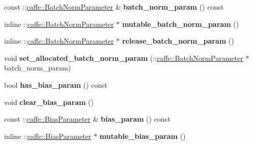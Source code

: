 \begin{DoxyCompactItemize}
const \+::\mbox{\hyperlink{classcaffe_1_1_batch_norm_parameter}{caffe\+::\+Batch\+Norm\+Parameter}} \& {\bfseries batch\+\_\+norm\+\_\+param} () const
\item 
\mbox{\label{classcaffe_1_1_layer_parameter_a4ec80c6e21c519f85e61f1403fd476d7}} 
inline \+::\mbox{\hyperlink{classcaffe_1_1_batch_norm_parameter}{caffe\+::\+Batch\+Norm\+Parameter}} $\ast$ {\bfseries mutable\+\_\+batch\+\_\+norm\+\_\+param} ()
\item 
\mbox{\label{classcaffe_1_1_layer_parameter_afbb8556a5265d6587b0ffab77b5e0688}} 
inline \+::\mbox{\hyperlink{classcaffe_1_1_batch_norm_parameter}{caffe\+::\+Batch\+Norm\+Parameter}} $\ast$ {\bfseries release\+\_\+batch\+\_\+norm\+\_\+param} ()
\item 
\mbox{\label{classcaffe_1_1_layer_parameter_a5f0101a591a38ef54b17f3f054821017}} 
void {\bfseries set\+\_\+allocated\+\_\+batch\+\_\+norm\+\_\+param} (\+::\mbox{\hyperlink{classcaffe_1_1_batch_norm_parameter}{caffe\+::\+Batch\+Norm\+Parameter}} $\ast$batch\+\_\+norm\+\_\+param)
\item 
\mbox{\label{classcaffe_1_1_layer_parameter_a3f2ac850b6d6bc7e2e6a0014bff9a365}} 
bool {\bfseries has\+\_\+bias\+\_\+param} () const
\item 
\mbox{\label{classcaffe_1_1_layer_parameter_a47c1a4aa599b868d13005a714a690ab0}} 
void {\bfseries clear\+\_\+bias\+\_\+param} ()
\item 
\mbox{\label{classcaffe_1_1_layer_parameter_ab0dffab413f57f1beb4f80f07e5e3d7d}} 
const \+::\mbox{\hyperlink{classcaffe_1_1_bias_parameter}{caffe\+::\+Bias\+Parameter}} \& {\bfseries bias\+\_\+param} () const
\item 
\mbox{\label{classcaffe_1_1_layer_parameter_aa058148fa76bba9be7adb9c6e777b914}} 
inline \+::\mbox{\hyperlink{classcaffe_1_1_bias_parameter}{caffe\+::\+Bias\+Parameter}} $\ast$ {\bfseries mutable\+\_\+bias\+\_\+param} ()
\item 
\mbox{\label{classcaffe_1_1_layer_parameter_aefdf7f29abda012689ca776b6069eda0}} 

\end{DoxyCompactItemize}
